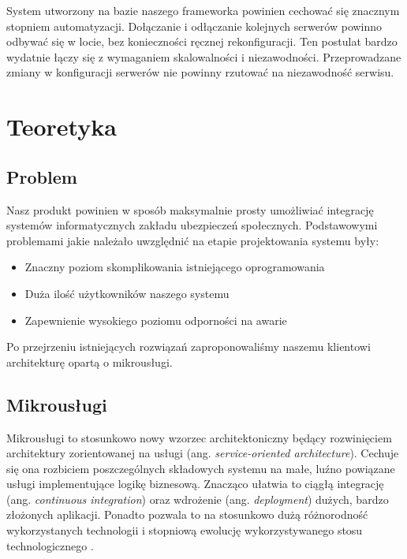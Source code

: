 \documentclass[licencjacka]{pracamgr}
\begin{document}
System utworzony na bazie naszego frameworka powinien cechować się znacznym stopniem
automatyzacji. Dołączanie i odłączanie kolejnych serwerów powinno odbywać się w locie,
bez konieczności ręcznej rekonfiguracji. Ten postulat bardzo wydatnie łączy się z
wymaganiem skalowalności i niezawodności. Przeprowadzane zmiany w konfiguracji serwerów
nie powinny rzutować na niezawodność serwisu.

\chapter{Teoretyka}

\section{Problem}

Nasz produkt powinien w sposób maksymalnie prosty umożliwiać integrację systemów
informatycznych zakładu ubezpieczeń społecznych. Podstawowymi problemami jakie
należało uwzględnić na etapie projektowania systemu były:
\begin{itemize}
	\item Znaczny poziom skomplikowania istniejącego oprogramowania
	\item Duża ilość użytkowników naszego systemu
	\item Zapewnienie wysokiego poziomu odporności na awarie
\end{itemize}
Po przejrzeniu istniejących rozwiązań zaproponowaliśmy naszemu klientowi
architekturę opartą o mikrousługi.

\section{Mikrousługi}

Mikrousługi \cite{fowlermicroservices} to stosunkowo nowy wzorzec architektoniczny będący rozwinięciem
architektury zorientowanej na usługi (ang. \textit{service-oriented architecture}).
Cechuje się ona rozbiciem poszczególnych składowych systemu na małe, luźno powiązane
usługi implementujące logikę biznesową. Znacząco ułatwia to ciągłą integrację (ang.
\textit{continuous integration}) oraz wdrożenie (ang. \textit{deployment}) dużych,
bardzo złożonych aplikacji. Ponadto pozwala to na stosunkowo dużą różnorodność
wykorzystanych technologii i stopniową ewolucję wykorzystywanego stosu technologicznego
\cite{microsvc}.
\end{document}
